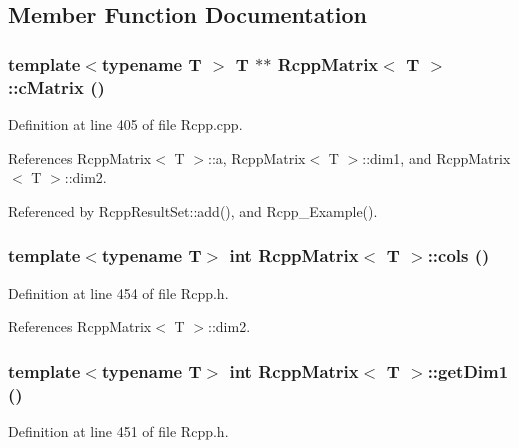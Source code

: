\subsection{Member Function Documentation}
\hypertarget{classRcppMatrix_ae94a95b2125bd594965e26a93c994da4}{
\subsubsection[{cMatrix}]{\setlength{\rightskip}{0pt plus 5cm}template$<$typename T $>$ T $\ast$$\ast$ {\bf RcppMatrix}$<$ T $>$::cMatrix ()}}
\label{classRcppMatrix_ae94a95b2125bd594965e26a93c994da4}


Definition at line 405 of file Rcpp.cpp.

References RcppMatrix$<$ T $>$::a, RcppMatrix$<$ T $>$::dim1, and RcppMatrix$<$ T $>$::dim2.

Referenced by RcppResultSet::add(), and Rcpp\_\-Example().\hypertarget{classRcppMatrix_a1b92a0bda663e14ea2f225e755029299}{
\subsubsection[{cols}]{\setlength{\rightskip}{0pt plus 5cm}template$<$typename T$>$ int {\bf RcppMatrix}$<$ T $>$::cols ()}}
\label{classRcppMatrix_a1b92a0bda663e14ea2f225e755029299}


Definition at line 454 of file Rcpp.h.

References RcppMatrix$<$ T $>$::dim2.\hypertarget{classRcppMatrix_aedbe27d643d704a0f5a995821307fdaf}{
\subsubsection[{getDim1}]{\setlength{\rightskip}{0pt plus 5cm}template$<$typename T$>$ int {\bf RcppMatrix}$<$ T $>$::getDim1 ()}}
\label{classRcppMatrix_aedbe27d643d704a0f5a995821307fdaf}


Definition at line 451 of file Rcpp.h.


